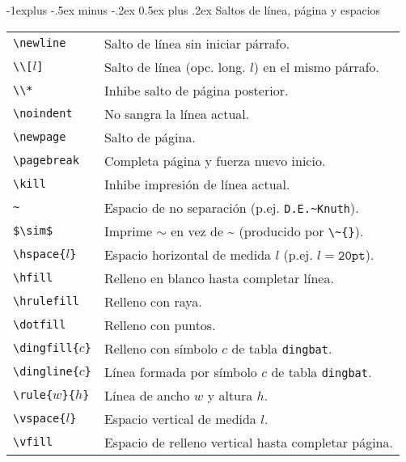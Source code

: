 \documentclass[10pt,landscape,a4paper]{article}
\makeatletter
\renewcommand{\subsection}{\@startsection{subsection}{2}{0mm}%
                                {-1explus -.5ex minus -.2ex}%
                                {0.5ex plus .2ex}%
                                {\normalfont\normalsize\bfseries}}
\makeatother
\begin{document}
\begin{multicols}{3}
\subsection{Saltos de línea, página y espacios}
\begin{tabular}{@{}p{\the\MyLen}%
                @{}p{\linewidth-\the\MyLen}@{}}
\verb!\newline!			&  Salto de línea sin iniciar párrafo.  \\
\verb!\\[!$l$\verb!]!	&  Salto de línea (opc. long. $l$) en el mismo párrafo.   \\
\verb!\\*!         		&  Inhibe salto de página posterior. \\
\verb!\noindent!   		&  No sangra la línea actual. \\
\verb!\newpage!    		&  Salto de página. \\
\verb!\pagebreak!  		&  Completa página y fuerza nuevo inicio. \\
\verb!\kill!       		&  Inhibe impresión de línea actual. \\
\verb!~!       			&  Espacio de no separación (p.ej. \verb!D.E.~Knuth!). \\
\verb!$\sim$!  			&  Imprime $\sim$ en vez de \~{} (producido por \verb!\~{}!). \\
\verb!\hspace{!$l$\verb!}! 		& Espacio horizontal de medida $l$
                                (p.ej. $l=\mathtt{20pt}$). \\
\verb!\hfill!  			& Relleno en blanco hasta completar línea.\\
\verb!\hrulefill!  		& Relleno con raya. \\
\verb!\dotfill!    		& Relleno con puntos. \\
\verb!\dingfill{!$c$\verb!}!    & Relleno con símbolo $c$ de tabla \texttt{dingbat}. \\
\verb!\dingline{!$c$\verb!}!    & Línea formada por símbolo $c$ de tabla \texttt{dingbat}. \\
\verb!\rule{!$w$\verb!}{!$h$\verb!}! & Línea de ancho $w$ y altura $h$. \\
\verb!\vspace{!$l$\verb!}! 		& Espacio vertical de medida $l$. \\
\verb!\vfill!  			& Espacio de relleno vertical hasta completar página. \\
\end{tabular}






\end{multicols}
\end{document}
